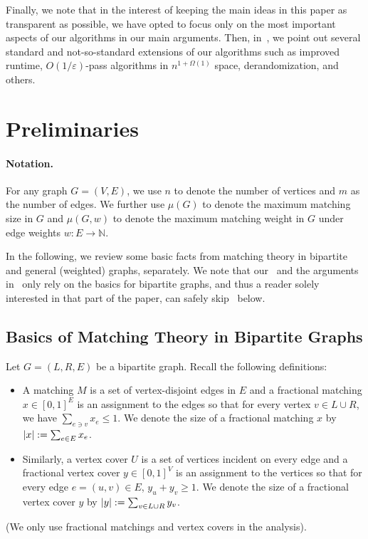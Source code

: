 \documentclass{theoretics}
\renewcommand{\leq}{\leqslant}
\renewcommand{\geq}{\geqslant}
\DeclarePairedDelimiter{\card}{\vert}{\vert}
\newcommand{\eps}{\varepsilon}
\newcommand{\IN}{\mathbb{N}}
\begin{document}
Finally, we note that in the interest of keeping the main ideas in this paper as transparent as possible, we have opted to focus only on the most important aspects of our algorithms 
in our main arguments. Then, in~, we point out several standard and not-so-standard extensions of our algorithms such as improved runtime, $O(1/\eps)$-pass algorithms in $n^{1+\Omega(1)}$ space, derandomization,  and others.


\newcommand{\qe}[1]{\ensuremath{q^{(#1)}}}
\newcommand{\Qe}[1]{\ensuremath{Q^{(#1)}}}

\newcommand{\pe}[1]{\ensuremath{p^{(#1)}}}

\newcommand{\UU}{\ensuremath{\mathcal{U}}}

\section{Preliminaries}\label{sec:prelim}

\paragraph{Notation.} For any graph $G=(V,E)$, we use $n$ to denote the number of vertices and $m$ as the number of edges. 
We further use $\mu(G)$ to denote the maximum matching size in $G$ and $\mu(G,w)$ to denote the maximum matching weight in $G$ under edge weights $w: E \rightarrow \IN$. 


In the following, we review some basic facts from matching theory in bipartite and general (weighted) graphs, separately. We note that our~ and the arguments in~ only 
rely on the basics for bipartite graphs, and thus a reader solely interested in that part of the paper, can safely skip~ below. 

\subsection{Basics of Matching Theory in Bipartite Graphs}\label{sec:basics-bipartite}

Let $G=(L,R,E)$ be a bipartite graph. Recall the following definitions: 
\begin{itemize}
\item A matching $M$ is a set of vertex-disjoint edges in $E$ and a fractional matching $x \in [0,1]^E$ is an assignment to the edges 
so that for every vertex $v \in L \cup R$, we have $\sum_{e \ni v} x_e \leq 1$. We denote the size of a fractional matching $x$ by $\card{x} := \sum_{e \in E} x_e$. 
\item Similarly, a vertex cover $U$ is a set of vertices incident on every edge and a fractional vertex cover $y \in [0,1]^V$ is an assignment to the vertices so that for every edge $e=(u,v) \in E$, $y_u + y_v \geq 1$. 
We denote the size of a fractional vertex cover $y$ by $\card{y} := \sum_{v \in L \cup R} y_v$. 
\end{itemize}
(We only use fractional matchings and vertex covers  in the analysis). 
\end{document}
